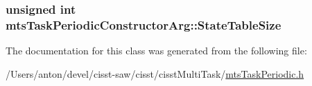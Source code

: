 \subsubsection[{State\+Table\+Size}]{\setlength{\rightskip}{0pt plus 5cm}unsigned int mts\+Task\+Periodic\+Constructor\+Arg\+::\+State\+Table\+Size}\label{classmts_task_periodic_constructor_arg_a63da643cce33a5cb0e262e4cb391c0a6}


The documentation for this class was generated from the following file\+:\begin{DoxyCompactItemize}
\item 
/\+Users/anton/devel/cisst-\/saw/cisst/cisst\+Multi\+Task/\hyperlink{mts_task_periodic_8h}{mts\+Task\+Periodic.\+h}\end{DoxyCompactItemize}
